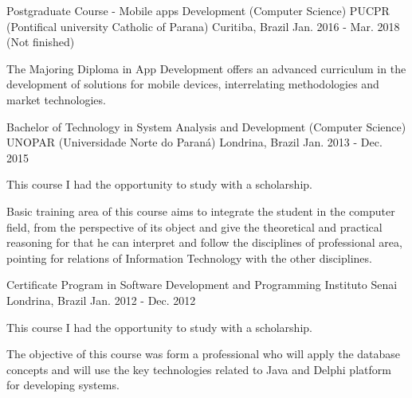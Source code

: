 

\begin{cventries}

  \cventry
    {Postgraduate Course - Mobile apps Development (Computer Science)} %
    {PUCPR (Pontifical university Catholic of Parana)} %
    {Curitiba, Brazil} %
    {Jan. 2016 - Mar. 2018 (Not finished)} %
    {
      \begin{cvitems} %
\item {The Majoring Diploma in App Development offers an advanced curriculum in the development of solutions for mobile devices, interrelating methodologies and market technologies.}
      \end{cvitems}
    }

  \cventry
    {Bachelor of Technology in System Analysis and Development (Computer Science)} %
    {UNOPAR (Universidade Norte do Paraná)} %
    {Londrina, Brazil} %
    {Jan. 2013 - Dec. 2015} %
    {
      \begin{cvitems} %
          \item {  This course I had the opportunity to study with a scholarship. }
\item {Basic training area of this course aims to integrate the student in the computer field, from the perspective of its object and give the theoretical and practical reasoning for that he can interpret and follow the disciplines of professional area, pointing for relations of Information Technology with the other disciplines.}
      \end{cvitems}
    }
  \cventry
    {Certificate Program in Software Development and Programming} %
    {Instituto Senai} %
    {Londrina, Brazil} %
    {Jan. 2012 - Dec. 2012} %
    {
      \begin{cvitems} %
    \item {  This course I had the opportunity to study with a scholarship. }
\item {The objective of this course was form a professional who will apply the database concepts and will use the key technologies related to Java and Delphi platform for developing systems.}
      \end{cvitems}
    }
\end{cventries}
